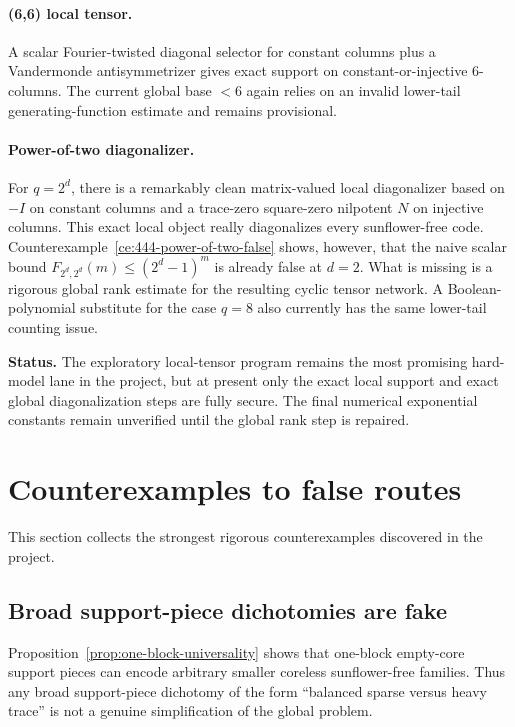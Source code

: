 \documentclass[11pt]{article}
\theoremstyle{definition}
\newcommand{\1}{\mathbf{1}}
\newcommand{\status}[1]{\par\smallskip\noindent\textbf{Status.} #1\par\smallskip}
\begin{document}
\paragraph{(6,6) local tensor.}
A scalar Fourier-twisted diagonal selector for constant columns plus a Vandermonde antisymmetrizer gives exact support on constant-or-injective 6-columns. The current global base $<6$ again relies on an invalid lower-tail generating-function estimate and remains provisional.

\paragraph{Power-of-two diagonalizer.}
For $q=2^d$, there is a remarkably clean matrix-valued local diagonalizer based on $-I$ on constant columns and a trace-zero square-zero nilpotent $N$ on injective columns. This exact local object really diagonalizes every sunflower-free code. Counterexample~\ref{ce:444-power-of-two-false} shows, however, that the naive scalar bound $F_{2^d,2^d}(m)\le (2^d-1)^m$ is already false at $d=2$. What is missing is a rigorous global rank estimate for the resulting cyclic tensor network. A Boolean-polynomial substitute for the case $q=8$ also currently has the same lower-tail counting issue.

\status{The exploratory local-tensor program remains the most promising hard-model lane in the project, but at present only the exact local support and exact global diagonalization steps are fully secure. The final numerical exponential constants remain unverified until the global rank step is repaired.}

\section{Counterexamples to false routes}\label{sec:counterexamples}
This section collects the strongest rigorous counterexamples discovered in the project.

\subsection{Broad support-piece dichotomies are fake}
Proposition~\ref{prop:one-block-universality} shows that one-block empty-core support pieces can encode arbitrary smaller coreless sunflower-free families. Thus any broad support-piece dichotomy of the form ``balanced sparse versus heavy trace'' is not a genuine simplification of the global problem.
\end{document}
